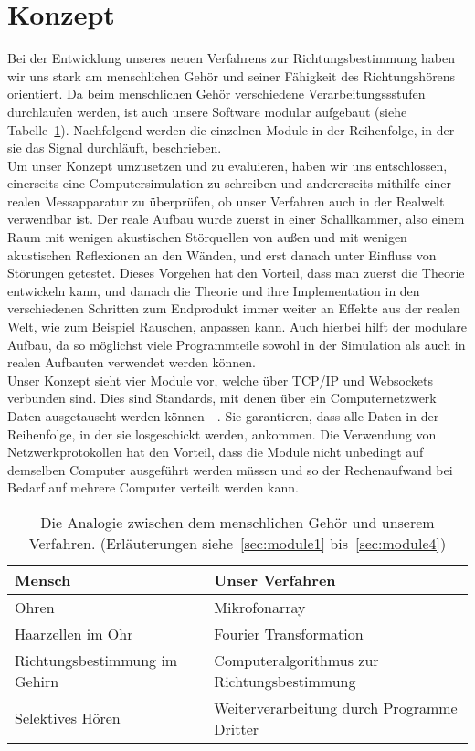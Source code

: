 \section{Konzept}
Bei der Entwicklung unseres neuen Verfahrens zur Richtungsbestimmung haben wir uns stark am menschlichen Gehör und seiner Fähigkeit des Richtungshörens orientiert. Da beim menschlichen Gehör verschiedene Verarbeitungssstufen durchlaufen werden, ist auch unsere Software modular aufgebaut (siehe Tabelle~\ref{analog}). Nachfolgend werden die einzelnen Module in der Reihenfolge, in der sie das Signal durchläuft, beschrieben.\\
Um unser Konzept umzusetzen und zu evaluieren, haben wir uns entschlossen, einerseits eine Computersimulation zu schreiben und andererseits mithilfe einer realen Messapparatur zu überprüfen, ob unser Verfahren auch in der Realwelt verwendbar ist. Der reale Aufbau wurde zuerst in einer Schallkammer, also einem Raum mit wenigen akustischen Störquellen von außen und mit wenigen akustischen Reflexionen an den Wänden, und erst danach unter Einfluss von Störungen getestet. Dieses Vorgehen hat den Vorteil, dass man zuerst die Theorie entwickeln kann, und danach die Theorie und ihre Implementation in den verschiedenen Schritten zum Endprodukt immer weiter an Effekte aus der realen Welt, wie zum Beispiel Rauschen, anpassen kann. Auch hierbei hilft der modulare Aufbau, da so möglichst viele Programmteile sowohl in der Simulation als auch in realen Aufbauten verwendet werden können.\\
Unser Konzept sieht vier Module vor, welche über TCP/IP und Websockets verbunden sind. Dies sind Standards, mit denen über ein Computernetzwerk Daten ausgetauscht werden können~\cite{tcp}~\cite{websockets}. Sie garantieren, dass alle Daten in der Reihenfolge, in der sie losgeschickt werden, ankommen. Die Verwendung von Netzwerkprotokollen hat den Vorteil, dass die Module nicht unbedingt auf demselben Computer ausgeführt werden müssen und so der Rechenaufwand bei Bedarf auf mehrere Computer verteilt werden kann.
\begin{table}[h]
	\centering
	\begin{tabular}{ll}
      Mensch            & Unser Verfahren                                   \\ \midrule
      Ohren             & Mikrofonarray                              \\
      Haarzellen im Ohr & Fourier Transformation                     \\
      Richtungsbestimmung im Gehirn            & Computeralgorithmus zur Richtungsbestimmung                       \\
      Selektives Hören  & Weiterverarbeitung durch Programme Dritter
	\end{tabular}
    \caption{Die Analogie zwischen dem menschlichen Gehör und unserem Verfahren. (Erläuterungen siehe~\ref{sec:module1} bis~\ref{sec:module4})\label{analog}}
\end{table}

